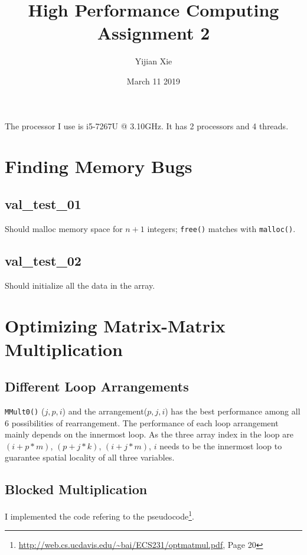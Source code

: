 \documentclass{article}
\title{High Performance Computing Assignment 2}
\author{Yijian Xie}
\date{March 11 2019}
\begin{document}
\maketitle
The processor I use is i5-7267U @ 3.10GHz. It has 2 processors and 4 threads.
\section{Finding Memory Bugs}
    \subsection{val\_test\_01}
        Should malloc memory space for $n + 1$ integers; \verb|free()| matches with
 \verb|malloc()|.
    \subsection{val\_test\_02}
        Should initialize all the data in the array. 
        
\section{Optimizing Matrix-Matrix Multiplication}
    \subsection{Different Loop Arrangements}
        \verb|MMult0()| ($j,p,i$) and the arrangement($p, j, i$) has the best performance among all 6 possibilities of rearrangement. The performance of each loop arrangement mainly depends on the innermost loop. As the three array index in the loop are $(i + p * m)$, $(p + j * k)$, $(i + j * m)$, $i$ needs to be the innermost loop to guarantee spatial locality of all three variables.
    \subsection{Blocked Multiplication}
        I implemented the code refering to the pseudocode\footnote{\url{http://web.cs.ucdavis.edu/~bai/ECS231/optmatmul.pdf}, Page 20}.
        
\end{document}
